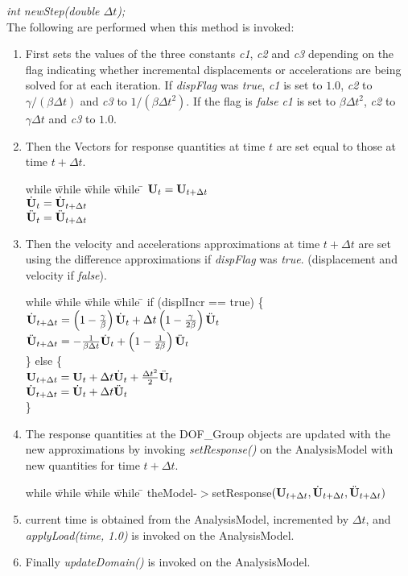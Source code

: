 {\em int newStep(double $\Delta t$);}\\
The following are performed when this method is invoked:
\begin{enumerate}
\item First sets the values of the three constants {\em c1}, {\em c2}
and {\em c3} depending on the flag indicating whether incremental
displacements or accelerations are being solved for at each iteration.
If {\em dispFlag} was {\em true}, {\em c1} is set to $1.0$, {\em c2} to $
\gamma / (\beta \Delta t)$ and {\em c3} to $1/ (\beta \Delta t^2)$. If
the flag is {\em false} {\em c1} is set to $\beta \Delta t^2$, {\em c2} to $
\gamma \Delta t$ and {\em c3} to $1.0$. 
\item Then the Vectors for response quantities at time $t$ are set
equal to those at time $t + \Delta t$.
\begin{tabbing}
while \= while \= while \= while \= \kill
\>\> $ {\bf U}_t = {\bf U}_{t + \Delta t}$ \\
\>\> $ \dot{\bf U}_t = \dot{\bf U}_{t + \Delta t} $ \\
\>\> $ \ddot{\bf U}_t = \ddot{\bf U}_{t + \Delta t} $ 
\end{tabbing}
\item Then the velocity and accelerations approximations at time $t +
\Delta t$ are set using the difference approximations if {\em
dispFlag} was {\em true}. (displacement and velocity if {\em false}).
\begin{tabbing}
while \= while \= while \= while \= \kill
\>\> if (displIncr == true) \{ \\
\>\>\> $ \dot {{\bf U}}_{t + \Delta t} = 
 \left( 1 - \frac{\gamma}{\beta}\right) \dot {{\bf U}}_t + \Delta t \left(1
- \frac{\gamma}{2 \beta}\right) \ddot {{\bf U}}_t $ \\
\>\>\> $ \ddot {{\bf U}}_{t + \Delta t} = 
 - \frac{1}{\beta \Delta t} \dot {{\bf U}}_t + \left( 1 - \frac{1}{2
\beta} \right) \ddot {{\bf U}}_t  $ \\
\>\> \} else \{ \\
\>\>\> $ {\bf U}_{t + \Delta t} = {\bf U}_t + \Delta t \dot{\bf U}_t + \frac{\Delta
t^2}{2}\ddot{\bf U}_t$ \\
\>\>\> $ \dot{\bf U}_{t + \Delta t} = \dot{\bf U}_t +  \Delta t \ddot{\bf U}_t $ \\
\>\> \} 
\end{tabbing}
\item The response quantities at the DOF\_Group objects are updated
with the new approximations by invoking {\em setResponse()} on the
AnalysisModel with new quantities for time $t + \Delta t$.
\begin{tabbing}
while \= while \= while \= while \= \kill
\>\> theModel-$>$setResponse$({\bf U}_{t + \Delta t}, \dot{\bf U}_{t+\Delta t},
\ddot{\bf U}_{t+\Delta t})$ 
\end{tabbing}
\item current time is obtained from the AnalysisModel, incremented by
$\Delta t$, and {\em applyLoad(time, 1.0)} is invoked on the
AnalysisModel. 
\item Finally {\em updateDomain()} is invoked on the AnalysisModel.
\end{enumerate}

